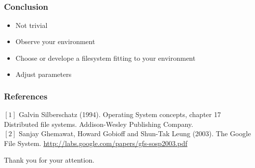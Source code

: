 \documentclass[notes=hide,yellow]{beamer}
\begin{document}
\subsection*{}

\begin{frame}
\frametitle{Conclusion}
	\begin{itemize}
		\item Not trivial
		\item Observe your environment
		\item Choose or develope a filesystem fitting to your environment
		\item Adjust parameters
	\end{itemize}
\end{frame}

\begin{frame}
	\frametitle{References}
	$[1]$ Galvin Silberschatz (1994). Operating System concepts, chapter 17 Distributed file systems. Addison-Wesley Publishing Company. \\ 
	$[2]$ Sanjay Ghemawat, Howard Gobioff and Shun-Tak Leung (2003). The Google File System. \url{http://labs.google.com/papers/gfs-sosp2003.pdf}
\end{frame}

\begin{frame}
	Thank you for your attention.
\end{frame}
\end{document}
